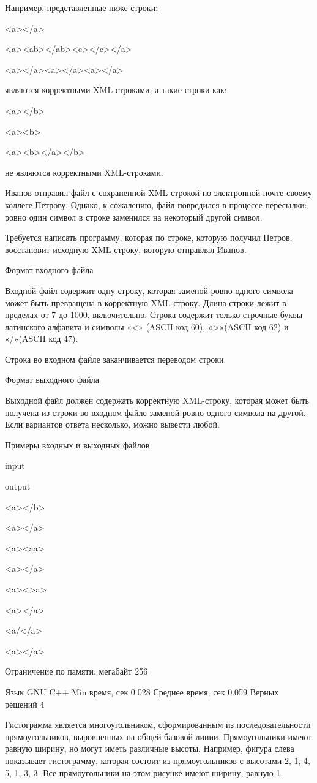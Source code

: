 \documentclass[]{article}
\begin{document}
Например, представленные ниже строки:

<a></a>

<a><ab></ab><c></c></a>

<a></a><a></a><a></a>

являются корректными XML-строками, а такие строки как:

<a></b>

<a><b>

<a><b></a></b>

не являются корректными XML-строками.

Иванов отправил файл с сохраненной XML-строкой по электронной почте своему коллеге Петрову. Однако, к сожалению, файл повредился в процессе пересылки: ровно один символ в строке заменился на некоторый другой символ.

Требуется написать программу, которая по строке, которую получил Петров, восстановит исходную XML-строку, которую отправлял Иванов.

Формат входного файла

Входной файл содержит одну строку, которая заменой ровно одного символа может быть превращена в корректную XML-строку. Длина строки лежит в пределах от 7 до 1000, включительно. Строка содержит только строчные буквы латинского алфавита и символы «<» (ASCII код 60), «>»(ASCII код 62) и «/»(ASCII код 47).

Строка во входном файле заканчивается переводом строки.

Формат выходного файла

Выходной файл должен содержать корректную XML-строку, которая может быть получена из строки во входном файле заменой ровно одного символа на другой. Если вариантов ответа несколько, можно вывести любой.

Примеры входных и выходных файлов

input
	

output

<a></b>
	

<a></a>

<a><aa>
	

<a></a>

<a><>a>
	

<a></a>

<a/</a>
	

<a></a>


Ограничение по памяти, мегабайт	256
	
Язык	GNU C++
Min время, сек	0.028
Среднее время, сек	0.059
Верных решений	4

Гистограмма является многоугольником, сформированным из последовательности прямоугольников, выровненных на общей базовой линии. Прямоугольники имеют равную ширину, но могут иметь различные высоты. Например, фигура слева показывает гистограмму, которая состоит из прямоугольников с высотами 2, 1, 4, 5, 1, 3, 3. Все прямоугольники на этом рисунке имеют ширину, равную 1.
\end{document}
